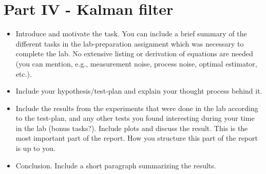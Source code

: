\section{Part IV - Kalman filter}
\begin{itemize}
    \item Introduce and motivate the task. You can include a brief summary of the different tasks in the lab-preparation assignment which was necessary to complete the lab. No extensive listing or derivation of equations are needed (you can mention, e.g., measurement noise, process noise, optimal estimator, etc.). 
    \item Include your hypothesis/test-plan and explain your thought process behind it.
    \item Include the results from the experiments that were done in the lab according to the test-plan, and any other tests you found interesting during your time in the lab (bonus tasks?). Include plots and discuss the result. This is the most important part of the report. How you structure this part of the report is up to you. 
    \item Conclusion. Include a short paragraph summarizing the results. 
\end{itemize}
